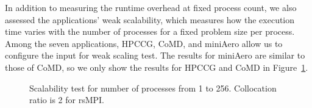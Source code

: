 In addition to measuring the runtime overhead at fixed process count, we also assessed the applications' weak scalability, which measures how the execution time varies with the number of processes for a fixed problem size per process.
Among the seven applications, HPCCG, CoMD, and miniAero allow us to configure the input for weak scaling test. The results for miniAero are similar to those of CoMD, so we only show the results for HPCCG and CoMD in Figure~\ref{fig:scalability}. %


\begin{figure}[!t]
	\begin{center}
	\end{center}
	\caption{Scalability test for number of processes from 1 to 256. Collocation ratio is 2 for rsMPI.}
	\label{fig:scalability}
\end{figure}

